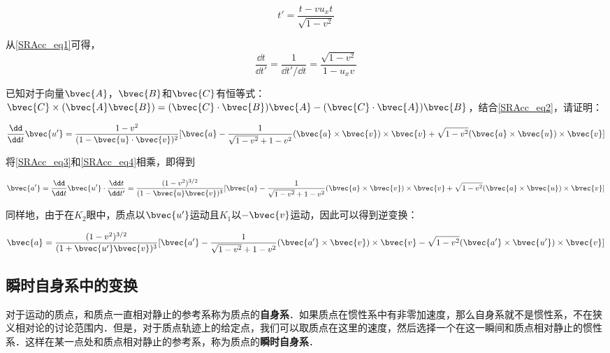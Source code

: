 \begin{equation}\label{SRAcc_eq1}
t'=\frac{t-vu_xt}{\sqrt{1-v^2}}
\end{equation}

从\autoref{SRAcc_eq1}可得，
\begin{equation}\label{SRAcc_eq3}
\frac{\dd t}{\dd t'}=\frac{1}{\dd t'/\dd t}=\frac{\sqrt{1-v^2}}{1-u_xv}
\end{equation}

\begin{exercise}{}

已知对于向量$\bvec{A}$，$\bvec{B}$和$\bvec{C}$有恒等式：$\bvec{C}\times(\bvec{A}\bvec{B})=(\bvec{C}\cdot\bvec{B})\bvec{A}-(\bvec{C}\cdot\bvec{A})\bvec{B}$，结合\autoref{SRAcc_eq2}，请证明：

\begin{equation}\label{SRAcc_eq4}
\frac{\dd}{\dd t}\bvec{u'}=\frac{1-v^2}{(1-\bvec{u}\cdot\bvec{v})^2}[\bvec{a}-\frac{1}{\sqrt{1-v^2}+1-v^2}(\bvec{a}\times\bvec{v})\times\bvec{v}+\sqrt{1-v^2}(\bvec{a}\times\bvec{u})\times\bvec{v}]
\end{equation}

\end{exercise}

将\autoref{SRAcc_eq3}和\autoref{SRAcc_eq4}相乘，即得到

\begin{equation}
\bvec{a'}=\frac{\dd}{\dd t}\bvec{u'}\cdot\frac{\dd t}{\dd t'}=\frac{(1-v^2)^{3/2}}{(1-\bvec{u}\bvec{v})^3}[\bvec{a}-\frac{1}{\sqrt{1-v^2}+1-v^2}(\bvec{a}\times\bvec{v})\times\bvec{v}+\sqrt{1-v^2}(\bvec{a}\times\bvec{u})\times\bvec{v}]
\end{equation}

同样地，由于在$K_2$眼中，质点以$\bvec{u'}$运动且$K_1$以$-\bvec{v}$运动，因此可以得到逆变换：

\begin{equation}\label{SRAcc_eq5}
\bvec{a}=\frac{(1-v^2)^{3/2}}{(1+\bvec{u'}\bvec{v})^3}[\bvec{a'}-\frac{1}{\sqrt{1-v^2}+1-v^2}(\bvec{a'}\times\bvec{v})\times\bvec{v}-\sqrt{1-v^2}(\bvec{a'}\times\bvec{u'})\times\bvec{v}]
\end{equation}


\subsection{瞬时自身系中的变换}

对于运动的质点，和质点一直相对静止的参考系称为质点的\textbf{自身系}．如果质点在惯性系中有非零加速度，那么自身系就不是惯性系，不在狭义相对论的讨论范围内．但是，对于质点轨迹上的给定点，我们可以取质点在这里的速度，然后选择一个在这一瞬间和质点相对静止的惯性系．这样在某一点处和质点相对静止的参考系，称为质点的\textbf{瞬时自身系}．

